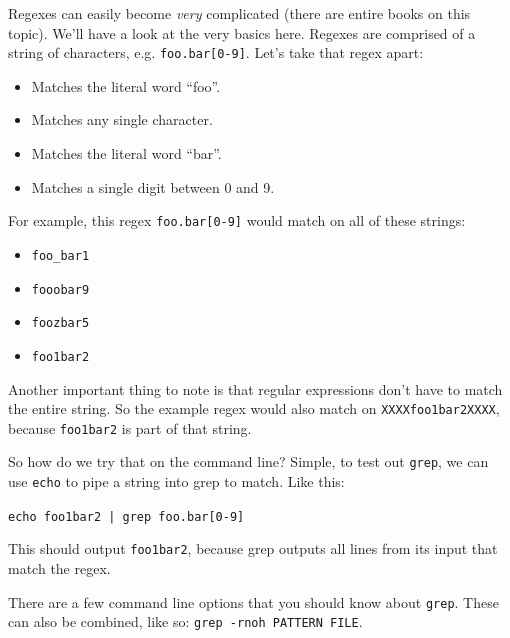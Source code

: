 \documentclass{TheAlternativeCourse}
\begin{document}
Regexes can easily become \emph{very} complicated (there are entire books on
this topic).  We'll have a look at the very basics here. Regexes are comprised
of a string of characters, e.g. \texttt{foo.bar[0-9]}. Let's take that regex
apart:

\begin{itemize}
    \setlength\itemsep{-9pt}
    \item{ Matches the literal word ``foo''.}
    \item{ Matches any single character.}
    \item{ Matches the literal word ``bar''.}
    \item{\makebox[1.5cm]{\: \texttt{[0-9]\hfill}} Matches a single digit between 0 and 9.}
\end{itemize}

For example, this regex \texttt{foo.bar[0-9]} would match on all of these
strings:

\begin{itemize}
    \setlength\itemsep{-9pt}
    \item \texttt{foo\_bar1}
    \item \texttt{fooobar9}
    \item \texttt{foozbar5}
    \item \texttt{foo1bar2}
\end{itemize}

Another important thing to note is that regular expressions don't have to match
the entire string. So the example regex would also match on
\texttt{XXXXfoo1bar2XXXX}, because \texttt{foo1bar2} is part of that string.

So how do we try that on the command line? Simple, to test out \texttt{grep},
we can use \texttt{echo} to pipe a string into grep to match. Like this:

\begin{cmdbox}
    \texttt{echo foo1bar2 | grep foo.bar[0-9]}
\end{cmdbox}

This should output \texttt{foo1bar2}, because grep outputs all lines from its
input that match the regex.

There are a few command line options that you should know about \texttt{grep}.
These can also be combined, like so: \texttt{grep -rnoh PATTERN FILE}.
\end{document}
